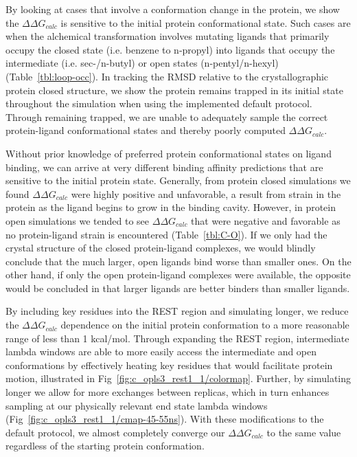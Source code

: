 \documentclass[journal=jctcce,manuscript=article]{achemso}
\begin{document}
By looking at cases that involve a conformation change in the protein, we show the $\Delta\Delta G_{calc}$ is sensitive to the initial protein conformational state.
Such cases are when the alchemical transformation involves mutating ligands that primarily occupy the closed state (i.e. benzene to n-propyl) into ligands that occupy the intermediate (i.e. sec-/n-butyl) or open states (n-pentyl/n-hexyl) (Table~\ref{tbl:loop-occ}).
In tracking the RMSD relative to the crystallographic protein closed structure, we show the protein remains trapped in its initial state throughout the simulation when using the implemented default protocol.
Through remaining trapped, we are unable to adequately sample the correct protein-ligand conformational states and thereby poorly computed $\Delta\Delta G_{calc}$. 

Without prior knowledge of preferred protein conformational states on ligand binding, we can arrive at very different binding affinity predictions that are sensitive to the initial protein state.
Generally, from protein closed simulations we found $\Delta\Delta G_{calc}$ were highly positive and unfavorable, a result from strain in the protein as the ligand begins to grow in the binding cavity.
However, in protein open simulations we tended to see $\Delta\Delta G_{calc}$ that were negative and favorable as no protein-ligand strain is encountered (Table~\ref{tbl:C-O}).
If we only had the crystal structure of the closed protein-ligand complexes, we would blindly conclude that the much larger, open ligands bind worse than smaller ones.
On the other hand, if only the open protein-ligand complexes were available, the opposite would be concluded in that larger ligands are better binders than smaller ligands.

By including key residues into the REST region and simulating longer, we reduce the $\Delta\Delta G_{calc}$ dependence on the initial protein conformation to a more reasonable range of less than 1 kcal/mol.
Through expanding the REST region, intermediate lambda windows are able to more easily access the intermediate and open conformations by effectively heating key residues that would facilitate protein motion, illustrated in Fig~\ref{fig:c_opls3_rest1_1/colormap}.
Further, by simulating longer we allow for more exchanges between replicas, which in turn enhances sampling at our physically relevant end state lambda windows (Fig~\ref{fig:c_opls3_rest1_1/cmap-45-55ns}).   
With these modifications to the default protocol, we almost completely converge our $\Delta\Delta G_{calc}$ to the same value regardless of the starting protein conformation.
\end{document}
